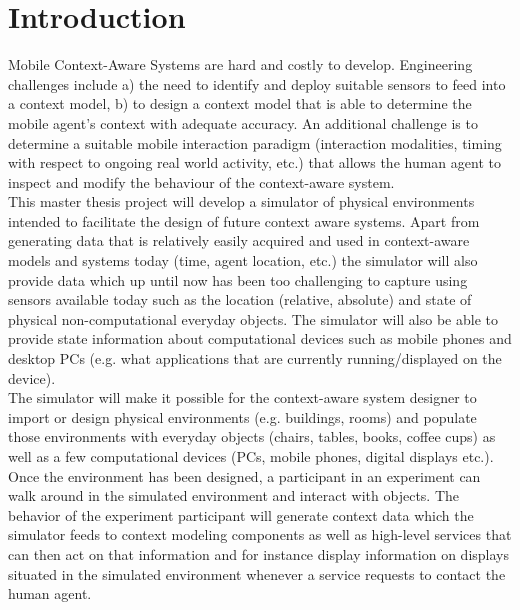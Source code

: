 \chapter{Introduction}\label{ch:introduction}


Mobile Context-Aware Systems are hard and costly to develop. Engineering challenges include a) the need to identify and deploy suitable sensors to feed into a context model, b) to design a context model that is able to determine the mobile agent's context with adequate accuracy. An additional challenge is to determine a suitable mobile interaction paradigm (interaction modalities, timing with respect to ongoing real world activity, etc.) that allows the human agent to inspect and modify the behaviour of the context-aware system. \\

This master thesis project will develop a simulator of physical environments intended to facilitate the design of future context aware systems. Apart from generating data that is relatively easily acquired and used in context-aware models and systems today (time, agent location, etc.) the simulator will also provide data which up until now has been too challenging to capture using sensors available today such as the location (relative, absolute) and state of physical non-computational everyday objects. The simulator will also be able to provide state information about computational devices such as mobile phones and desktop PCs (e.g. what applications that are currently running/displayed on the device). \\

The simulator will make it possible for the context-aware system designer to import or design physical environments (e.g. buildings, rooms) and populate those environments with everyday objects (chairs, tables, books, coffee cups) as well as a few computational devices (PCs, mobile phones, digital displays etc.). Once the environment has been designed, a participant in an experiment can walk around in the simulated environment and interact with objects. The behavior of the experiment participant will generate context data which the simulator feeds to context modeling components as well as high-level services that can then act on that information and for instance display information on displays situated in the simulated environment whenever a service requests to contact the human agent. \\

